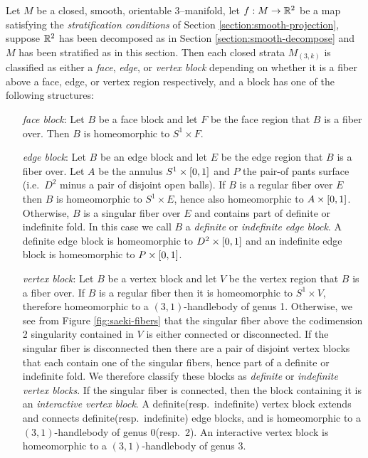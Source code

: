 \begin{theorem}
	\label{thm:block-structure}
	Let $M$ be a closed, smooth, orientable 3--manifold, let $f:M\to\mathbb{R}^2$ be a map satisfying the \emph{stratification conditions} of Section \ref{section:smooth-projection}, suppose $\mathbb{R}^2$ has been decomposed as in Section \ref{section:smooth-decompose} and $M$ has been stratified as in this section.
	Then each closed strata $M_{(3,k)}$ is classified as either a \emph{face}, \emph{edge}, or \emph{vertex block} depending on whether it is a fiber above a face, edge, or vertex region respectively, and a block has one of the following structures:
	\begin{enumerate}
		\item[\emph{face block}:]
		Let $B$ be a face block and let $F$ be the face region that $B$ is a fiber over.
		Then $B$ is homeomorphic to $S^1\times F$.
		
		\item[\emph{edge block}:]
		Let $B$ be an edge block and let $E$ be the edge region that $B$ is a fiber over.
		Let $A$ be the annulus $S^1\times[0,1]$ and $P$ the pair-of pants surface (i.e.\ $D^2$ minus a pair of disjoint open balls).
		If $B$ is a regular fiber over $E$ then $B$ is homeomorphic to $S^1\times E$, hence also homeomorphic to $A\times[0,1]$.
		Otherwise, $B$ is a singular fiber over $E$ and contains part of definite or indefinite fold.
		In this case we call $B$ a \emph{definite} or \emph{indefinite edge block}.
		A definite edge block is homeomorphic to $D^2\times[0,1]$ and an indefinite edge block is homeomorphic to $P\times[0,1]$.

		\item[\emph{vertex block}:]
		Let $B$ be a vertex block and let $V$ be the vertex region that $B$ is a fiber over.
		If $B$ is a regular fiber then it is homeomorphic to $S^1\times V$, therefore homeomorphic to a $(3,1)$-handlebody of genus 1.
		Otherwise, we see from Figure \ref{fig:saeki-fibers} that the singular fiber above the codimension 2 singularity contained in $V$ is either connected or disconnected.
		If the singular fiber is disconnected then there are a pair of disjoint vertex blocks that each contain one of the singular fibers, hence part of a definite or indefinite fold.
		We therefore classify these blocks as \emph{definite} or \emph{indefinite vertex blocks}.
		If the singular fiber is connected, then the block containing it is an \emph{interactive vertex block}.
		A definite(resp.\ indefinite) vertex block extends and connects definite(resp.\ indefinite) edge blocks, and is homeomorphic to a $(3,1)$-handlebody of genus 0(resp.\ 2).
		An interactive vertex block is homeomorphic to a $(3,1)$-handlebody of genus 3.
	\end{enumerate}
\end{theorem}

